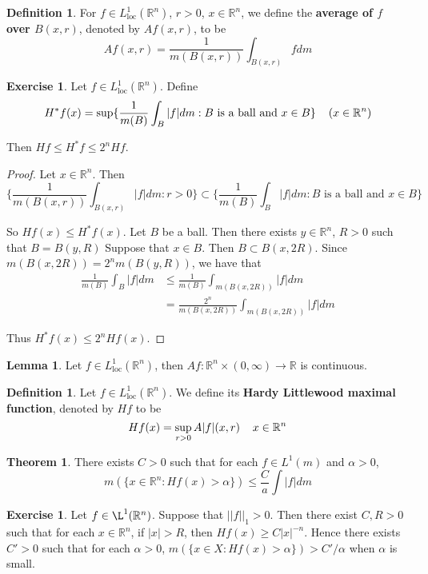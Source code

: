 \documentclass[12pt]{amsart}
\theoremstyle{definition}
\newtheorem{defn}[definition]{Definition}
\newtheorem{thm}[definition]{Theorem}
\newtheorem{lem}[definition]{Lemma}
\newtheorem{ex}[definition]{Exercise}
\newcommand{\al}{\alpha}
\newcommand{\R}{\mathbb{R}}
\newcommand{\Ll}{L^1_{\text{loc}}(\R^n)}
\newcommand{\lex}[1]{\label{ex:#1}}
\newcommand{\ld}[1]{\label{defn:#1}}
\begin{document}
	\begin{defn} \ld{00000} 
		For $f \in \Ll$, $r>0$, $x \in \R^n$, we define the \textbf{average of $f$ over $B(x,r)$}, denoted by $Af(x,r)$, to be $$Af(x,r) = \frac{1}{m(B(x,r))}\int_{B(x,r)}fdm$$
	\end{defn}
	
	\begin{ex} \lex{00000} 
		Let $f \in \Ll$. Define $$H^*f(x) = \sup\{\frac{1}{m(B)}\int_{B}|f|dm: B \text{ is a ball and } x \in B\} \hspace{4mm} (x \in \R^n)$$
		
		Then $Hf \leq H^*f \leq 2^n Hf$. 
	\end{ex}
	
	\begin{proof}
		Let $x \in \R^n$. Then $$\bigg \{ \frac{1}{m(B(x,r))}\int_{B(x,r)}|f|dm: r >0\bigg \} \subset \bigg\{ \frac{1}{m(B)}\int_{B}|f|dm: B \text{ is a ball and } x \in B \bigg\} $$
		
		So $Hf(x) \leq H^*f(x)$. Let $B$ be a ball. Then there exists $y \in \R^n$, $R>0$ such that $B = B(y,R)$ Suppose that $x \in B$. Then $B \subset B(x,2R)$. Since $m(B(x,2R)) = 2^n m(B(y,R))$, we have that 
		\begin{align*}
			\frac{1}{m(B)}\int_{B}|f|dm
			& \leq \frac{1}{m(B)} \int_{m(B(x,2R))}|f|dm\\
			&= \frac{2^n}{m(B(x,2R))} \int_{m(B(x,2R))}|f|dm
		\end{align*}
		
		Thus $H^*f(x) \leq 2^n Hf(x)$.
	\end{proof}
	
	\begin{lem}
		Let $f \in \Ll$, then $Af:\R^n \times (0, \infty)\rightarrow \R$ is continuous.
	\end{lem}
	
	\begin{defn} \ld{00000} 
		Let $f \in \Ll$. We define its \textbf{Hardy Littlewood maximal function}, denoted by $Hf$ to be $$Hf(x) = \sup_{r>0} A|f|(x,r) \hspace{4mm} x \in \R^n$$
	\end{defn}
	
	\begin{thm}
		There exists $C >0$ such that for each $f \in L^1(m)$ and $\al > 0$, $$m(\{x \in \R^n: Hf(x) > \al\}) \leq \frac{C}{a} \int |f|dm$$
	\end{thm}
	
	\begin{ex} \lex{00000} 
		Let $f \in \L^1(\R^n)$. Suppose that $||f||_1>0$. Then there exist $C,R>0$ such that for each $x \in \R^n$, if $|x| > R$, then $Hf(x) \geq C|x|^{-n}$. Hence there exists $C' > 0$ such that for each $\al >0$, $m(\{x \in X: Hf(x)>\alpha\}) > C'/\al$ when $\al$ is small. 
	\end{ex}
	
\end{document}
